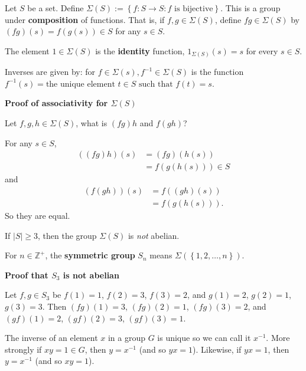 \documentclass{notes}
\begin{document}
\begin{eg}
  Let $S$ be a set.
  Define $\Sigma(S) := \left \{ f \colon S \to S : \text{$f$ is bijective} \right \}$.
  This is a group under {\boldmath \bfseries composition} of functions.
  That is, if $f, g \in \Sigma(S)$, define $f g \in \Sigma(S)$ by $(f g)(s) = f(g(s)) \in S$ for any $s \in S$.

  The element $1 \in \Sigma(S)$ is the {\boldmath \bfseries identity} function, $1_{\Sigma(S)}(s) = s$ for every $s \in S$.

  Inverses are given by: for $f \in \Sigma(s), f^{-1} \in \Sigma(S)$ is the function $f^{-1}(s) = \text{the unique element $t \in S$ such that $f(t) = s$}$.

  {\boldmath \bfseries Proof of associativity for $\Sigma(S)$}

  Let $f, g, h \in \Sigma(S)$, what is $(f g) h$ and $f (g h)$?

  For any $s \in S$, 
  \begin{align*}
    ((f g) h)(s) &= (f g) (h(s)) \\ 
    &= f(g(h(s))) \in S
  \end{align*}
  and 
  \begin{align*}
    (f (g h))(s) &= f((g h)(s)) \\ 
    &= f(g(h(s))).
  \end{align*}
  So they are equal.

  \begin{note}
    If $\left | S \right | \geq 3$, then the group $\Sigma(S)$ is \textit{not} abelian.

    \begin{defn}
      For $n \in \mathbb Z^+$, the {\boldmath \bfseries symmetric group} $S_n$ means $\Sigma(\left \{ 1, 2, \dots, n \right \})$.
    \end{defn}

    {\boldmath \bfseries Proof that $S_3$ is not abelian}

    Let $f, g \in S_3$ be $f(1) = 1$, $f(2) = 3$, $f(3) = 2$, and $g(1) = 2$, $g(2) = 1$, $g(3) = 3$.
    Then $(f g)(1) = 3$, $(f g)(2) = 1$, $(f g)(3) = 2$, and $(g f)(1) = 2$, $(g f)(2) = 3$, $(g f)(3) = 1$.

  \end{note}
\end{eg}

\begin{lem}
  The inverse of an element $x$ in a group $G$ is unique so we can call it $x^{-1}$.
  More strongly if $x y = 1 \in G$, then $y = x^{-1}$ (and so $y x = 1$).
  Likewise, if $y x = 1$, then $y = x^{-1}$ (and so $x y = 1$).
\end{lem}
\end{document}
